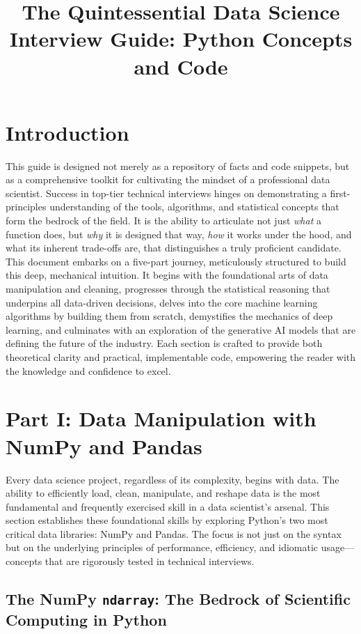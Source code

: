 \documentclass[11pt,a4paper]{article}
\title{The Quintessential Data Science Interview Guide: Python Concepts and Code}
\author{}
\date{}
\begin{document}
\maketitle

\section*{Introduction}

This guide is designed not merely as a repository of facts and code snippets, but as a comprehensive toolkit for cultivating the mindset of a professional data scientist. Success in top-tier technical interviews hinges on demonstrating a first-principles understanding of the tools, algorithms, and statistical concepts that form the bedrock of the field. It is the ability to articulate not just \textit{what} a function does, but \textit{why} it is designed that way, \textit{how} it works under the hood, and what its inherent trade-offs are, that distinguishes a truly proficient candidate. This document embarks on a five-part journey, meticulously structured to build this deep, mechanical intuition. It begins with the foundational arts of data manipulation and cleaning, progresses through the statistical reasoning that underpins all data-driven decisions, delves into the core machine learning algorithms by building them from scratch, demystifies the mechanics of deep learning, and culminates with an exploration of the generative AI models that are defining the future of the industry. Each section is crafted to provide both theoretical clarity and practical, implementable code, empowering the reader with the knowledge and confidence to excel.

\section{Part I: Data Manipulation with NumPy and Pandas}

Every data science project, regardless of its complexity, begins with data. The ability to efficiently load, clean, manipulate, and reshape data is the most fundamental and frequently exercised skill in a data scientist's arsenal. This section establishes these foundational skills by exploring Python's two most critical data libraries: NumPy and Pandas. The focus is not just on the syntax but on the underlying principles of performance, efficiency, and idiomatic usage—concepts that are rigorously tested in technical interviews.

\subsection{The NumPy \texttt{ndarray}: The Bedrock of Scientific Computing in Python}
\end{document}
